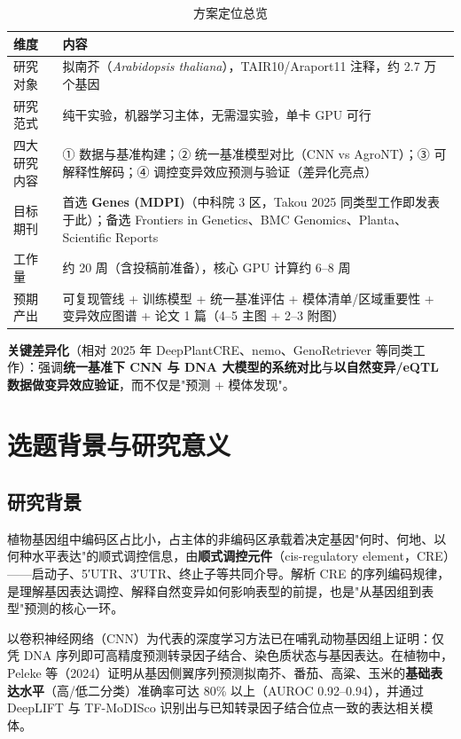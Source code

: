 \documentclass[UTF8,11pt,a4paper]{ctexart}
\begin{document}
\begin{table}[htbp]
\centering
\caption{方案定位总览}
\label{tab:overview}
\small
\begin{tabular}{@{}p{3.2cm}p{11.0cm}@{}}
\toprule
\textbf{维度} & \textbf{内容} \\
\midrule
研究对象 & 拟南芥（\emph{Arabidopsis thaliana}），TAIR10/Araport11 注释，约 2.7 万个基因 \\
研究范式 & 纯干实验，机器学习主体，无需湿实验，单卡 GPU 可行 \\
四大研究内容 & ① 数据与基准构建；② 统一基准模型对比（CNN vs AgroNT）；③ 可解释性解码；④ 调控变异效应预测与验证（差异化亮点） \\
目标期刊 & 首选 \textbf{Genes (MDPI)}（中科院 3 区，Takou 2025 同类型工作即发表于此）；备选 Frontiers in Genetics、BMC Genomics、Planta、Scientific Reports \\
工作量 & 约 20 周（含投稿前准备），核心 GPU 计算约 6--8 周 \\
预期产出 & 可复现管线 + 训练模型 + 统一基准评估 + 模体清单/区域重要性 + 变异效应图谱 + 论文 1 篇（4--5 主图 + 2--3 附图） \\
\bottomrule
\end{tabular}
\end{table}

\textbf{关键差异化}（相对 2025 年 DeepPlantCRE、nemo、GenoRetriever 等同类工作）：强调\textbf{统一基准下 CNN 与 DNA 大模型的系统对比}与\textbf{以自然变异/eQTL 数据做变异效应验证}，而不仅是"预测 + 模体发现"。

\section{选题背景与研究意义}
\label{sec:intro}

\subsection{研究背景}
\label{sec:intro-bg}

植物基因组中编码区占比小，占主体的非编码区承载着决定基因"何时、何地、以何种水平表达"的顺式调控信息，由\textbf{顺式调控元件}（cis-regulatory element，CRE）——启动子、5′UTR、3′UTR、终止子等共同介导。解析 CRE 的序列编码规律，是理解基因表达调控、解释自然变异如何影响表型的前提，也是"从基因组到表型"预测的核心一环\cite{marand2023}。

以卷积神经网络（CNN）为代表的深度学习方法已在哺乳动物基因组上证明：仅凭 DNA 序列即可高精度预测转录因子结合、染色质状态与基因表达\cite{zhou2015,avsec2021}。在植物中，Peleke 等（2024）证明从基因侧翼序列预测拟南芥、番茄、高粱、玉米的\textbf{基础表达水平}（高/低二分类）准确率可达 80\% 以上（AUROC 0.92--0.94），并通过 DeepLIFT 与 TF-MoDISco 识别出与已知转录因子结合位点一致的表达相关模体\cite{peleke2024}。
\end{document}
